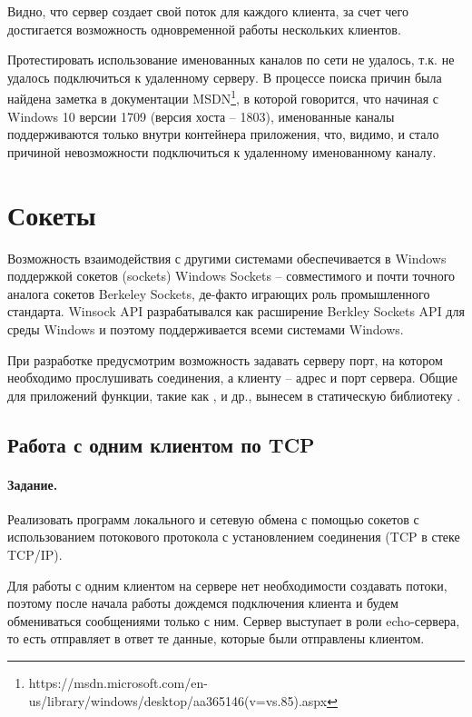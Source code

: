 Видно, что сервер создает свой поток для каждого клиента, за счет чего достигается возможность одновременной работы нескольких клиентов.

Протестировать использование именованных каналов по сети не удалось, т.к. не удалось подключиться к удаленному серверу. В процессе поиска причин была найдена заметка в документации MSDN\footnote{https://msdn.microsoft.com/en-us/library/windows/desktop/aa365146(v=vs.85).aspx}, в которой говорится, что начиная с Windows 10 версии 1709 (версия хоста -- 1803), именованные каналы поддерживаются только внутри контейнера приложения, что, видимо, и стало причиной невозможности подключиться к удаленному именованному каналу.

\section{Сокеты}

Возможность взаимодействия с другими системами обеспечивается в Windows поддержкой сокетов (sockets) Windows Sockets -- совместимого и почти точного аналога сокетов Berkeley Sockets, де-факто играющих роль промышленного стандарта. Winsock API разрабатывался как расширение Berkley Sockets API для среды Windows и поэтому поддерживается всеми системами Windows.

При разработке предусмотрим возможность задавать серверу порт, на котором необходимо прослушивать соединения, а клиенту -- адрес и порт сервера. Общие для приложений функции, такие как ,  и др., вынесем в статическую библиотеку .





\subsection{Работа с одним клиентом по TCP}

\paragraph{Задание.} Реализовать программ локального и сетевую обмена с помощью сокетов с использованием потокового протокола с установлением соединения (TCP в стеке TCP/IP).

Для работы с одним клиентом на сервере нет необходимости создавать потоки, поэтому после начала работы дождемся подключения клиента и будем обмениваться сообщениями только с ним. Сервер выступает в роли echo-сервера, то есть отправляет в ответ те данные, которые были отправлены клиентом.

